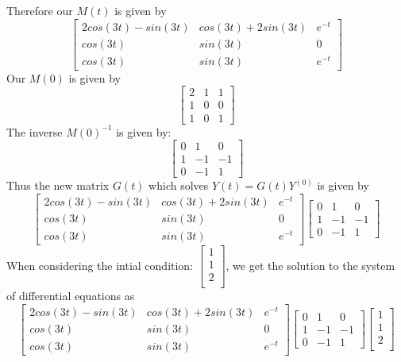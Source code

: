 \documentclass{article}
\begin{document}
Therefore our $M(t)$ is given by
$$\begin{bmatrix}
    2cos(3t) - sin(3t) & cos(3t)+2sin(3t) & e^{-t}\\
    cos(3t) & sin(3t) & 0\\
    cos(3t) & sin(3t) & e^{-t}
\end{bmatrix}$$
Our $M(0)$ is given by
$$\begin{bmatrix}
    2 & 1 & 1\\
    1 & 0 & 0\\
    1 & 0 & 1
\end{bmatrix}$$
The inverse $M(0)^{-1}$ is given by: $$\begin{bmatrix}
    0 & 1 & 0\\
    1 & -1 & -1\\
    0 & -1 & 1
\end{bmatrix}$$
Thus the new matrix $G(t)$ which solves $Y(t) = G(t)Y^{(0)}$ is given by
$$\begin{bmatrix}
    2cos(3t) - sin(3t) & cos(3t)+2sin(3t) & e^{-t}\\
    cos(3t) & sin(3t) & 0\\
    cos(3t) & sin(3t) & e^{-t}
\end{bmatrix} \begin{bmatrix}
    0 & 1 & 0\\
    1 & -1 & -1\\
    0 & -1 & 1
\end{bmatrix}$$
When considering the intial condition: $\begin{bmatrix}
    1\\
    1\\
    2\\
\end{bmatrix}$, we get the solution to the system of differential equations as
$$\begin{bmatrix}
    2cos(3t) - sin(3t) & cos(3t)+2sin(3t) & e^{-t}\\
    cos(3t) & sin(3t) & 0\\
    cos(3t) & sin(3t) & e^{-t}
\end{bmatrix} \begin{bmatrix}
    0 & 1 & 0\\
    1 & -1 & -1\\
    0 & -1 & 1
\end{bmatrix} \begin{bmatrix}
    1\\
    1\\
    2\\
\end{bmatrix}$$
\end{document}

